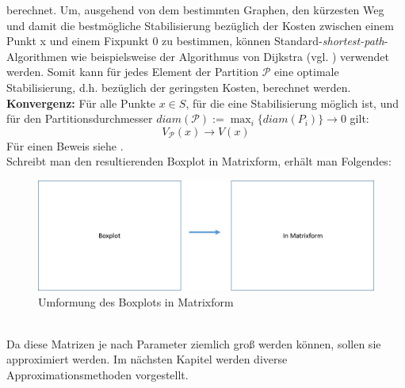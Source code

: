 \documentclass[12pt,a4paper,twoside]{article}
\begin{document}
	berechnet. \newline
	\newline
	Um, ausgehend von dem bestimmten Graphen, den kürzesten Weg und damit die bestmögliche Stabilisierung bezüglich 
	der Kosten zwischen einem Punkt x und einem Fixpunkt $0$ zu bestimmen, können Standard-\textit{shortest-path}-Algorithmen wie beispielsweise der Algorithmus von Dijkstra (vgl. \citep{Dijkstra59}) verwendet werden.
	\newline
	Somit kann für jedes Element der Partition $\mathcal{P}$ eine optimale Stabilisierung, d.h. bezüglich der geringsten Kosten, berechnet werden. \newline
	\newline
	\textbf{Konvergenz:} Für alle Punkte $x\in S$, für die eine Stabilisierung möglich ist, und für den Partitionsdurchmesser $diam(\mathcal{P}):=\max_i\{diam(P_i)\}\rightarrow 0$ gilt:
	\begin{equation*}
		V_\mathcal{P}(x)\rightarrow V(x)
	\end{equation*}
	Für einen Beweis siehe \cite{Junge2004}. \\
	Schreibt man den resultierenden Boxplot in Matrixform, erhält man Folgendes: \\
	\begin{figure}[h]
		\includegraphics[scale=0.5]{testbild}
		\caption{Umformung des Boxplots in Matrixform}
	\end{figure}
	\\
	Da diese Matrizen je nach Parameter ziemlich groß werden können, sollen sie approximiert werden. Im nächsten 
	Kapitel werden diverse Approximationsmethoden vorgestellt.
\end{document}
